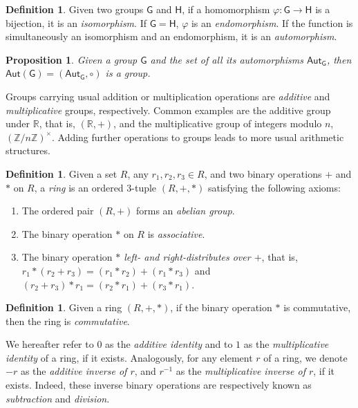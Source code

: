 \documentclass[12pt, a4paper, oneside]{memoir}
\newtheorem{proposition}[theorem]{Proposition}
\theoremstyle{definition}
\newtheorem{definition}[theorem]{Definition}
\begin{document}
\begin{definition}\label{def:morph}
  Given two groups $\mathsf{G}$ and $\mathsf{H}$, if a homomorphism $\varphi : \mathsf{G} \to \mathsf{H}$ is a bijection, it is an \emph{isomorphism}. If $\mathsf{G} = \mathsf{H}$, $\varphi$ is an \emph{endomorphism}. If the function is simultaneously an isomorphism and an endomorphism, it is an \emph{automorphism}.
\end{definition}

\begin{proposition}\label{prop:autgroup}
  Given a group $\mathsf{G}$ and the set of all its automorphisms $\mathsf{Aut}_{\mathsf{G}}$, then $\mathsf{Aut}(\mathsf{G}) = (\mathsf{Aut}_{\mathsf{G}}, \circ)$ is a group.
\end{proposition}

Groups carrying usual addition or multiplication operations are \emph{additive} and \emph{multiplicative} groups, respectively. Common examples are the additive group under $\mathbb{R}$, that is, $(\mathbb{R}, +)$, and the multiplicative group of integers modulo $n$, $(\mathbb{Z}/n\mathbb{Z})^{\times}$. Adding further operations to groups leads to more usual arithmetic structures.

\begin{definition}
  Given a set $R$, any $r_{1}, r_{2}, r_{3} \in R$, and two binary operations $+$ and $\ast$ on $R$, a \emph{ring} is an ordered 3-tuple $(R, +, \ast)$ satisfying the following axioms:
  
  \begin{enumerate}
    \item The ordered pair $(R, +)$ forms an \emph{abelian group}.
    \item The binary operation $\ast$ on $R$ is \emph{associative}.
    \item The binary operation \emph{$\ast$ left- and right-distributes over $+$}, that is, $r_{1} \ast (r_{2} + r_{3}) = (r_{1} \ast r_{2}) + (r_{1} \ast r_{3})$ and $(r_{2} + r_{3}) \ast r_{1} = (r_{2} \ast r_{1}) + (r_{3} \ast r_{1})$.
  \end{enumerate}
\end{definition}

\begin{definition}
  Given a ring $(R, +, \ast)$, if the binary operation $\ast$ is commutative, then the ring is \emph{commutative}.
\end{definition}

We hereafter refer to $0$ as the \emph{additive identity} and to $1$ as the \emph{multiplicative identity} of a ring, if it exists. Analogously, for any element $r$ of a ring, we denote $-r$ as the \emph{additive inverse of $r$}, and $r^{-1}$ as the \emph{multiplicative inverse of $r$}, if it exists. Indeed, these inverse binary operations are respectively known as \emph{subtraction} and \emph{division}.
\end{document}

